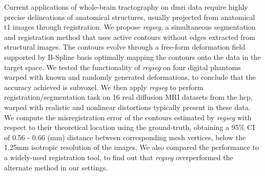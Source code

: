 Current applications of whole-brain tractography on \acrlong*{dmri} data require highly precise
  delineations of anatomical structures, usually projected from anatomical \acrlong*{t1} images
  through registration.
We propose \emph{regseg}, a simultaneous segmentation and registration method
  that uses active contours without edges extracted from structural images.
The contours evolve through a free-form deformation field supported by B-Spline basis
  optimally mapping the contours onto the data in the target space.
We tested the functionality of \emph{regseg} on four digital phantoms warped with known and
  randomly generated deformations, to conclude that the accuracy achieved is subvoxel.
We then apply \emph{regseg} to perform registration/segmentation task on 16 real diffusion MRI
  datasets from the \acrlong*{hcp}, warped with realistic and nonlinear distortions typically
  present in these data.
We compute the misregistration error of the contours estimated by \emph{regseg} with respect
  to their theoretical location using the ground-truth, obtaining a 95\% CI of 0.56 - 0.66 (mm)
  distance between corresponding mesh vertices, below the 1.25mm isotropic resolution of the images.
We also compared the performance to a widely-used registration tool, to find out
  that \emph{regseg} overperformed the alternate method in our settings.
